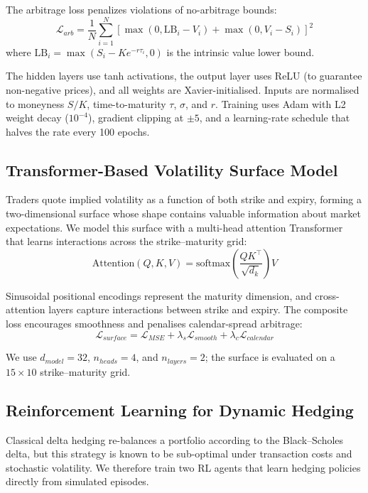 \documentclass[conference]{IEEEtran}
\begin{document}
The arbitrage loss penalizes violations of no-arbitrage bounds:
\begin{equation}
    \mathcal{L}_{arb} = \frac{1}{N} \sum_{i=1}^{N} \left[\max(0, \text{LB}_i - V_i) + \max(0, V_i - S_i)\right]^2
\end{equation}
where $\text{LB}_i = \max(S_i - Ke^{-r\tau_i}, 0)$ is the intrinsic value lower bound.

The hidden layers use tanh activations, the output layer uses ReLU (to guarantee non-negative prices), and all weights are Xavier-initialised. Inputs are normalised to moneyness $S/K$, time-to-maturity $\tau$, $\sigma$, and $r$. Training uses Adam with L2 weight decay ($10^{-4}$), gradient clipping at $\pm 5$, and a learning-rate schedule that halves the rate every 100 epochs.

\subsection{Transformer-Based Volatility Surface Model}

Traders quote implied volatility as a function of both strike and expiry, forming a two-dimensional surface whose shape contains valuable information about market expectations. We model this surface with a multi-head attention Transformer that learns interactions across the strike--maturity grid:
\begin{equation}
    \text{Attention}(Q, K, V) = \text{softmax}\left(\frac{QK^\top}{\sqrt{d_k}}\right)V
\end{equation}

Sinusoidal positional encodings represent the maturity dimension, and cross-attention layers capture interactions between strike and expiry. The composite loss encourages smoothness and penalises calendar-spread arbitrage:
\begin{equation}
    \mathcal{L}_{surface} = \mathcal{L}_{MSE} + \lambda_{s}\mathcal{L}_{smooth} + \lambda_{c}\mathcal{L}_{calendar}
\end{equation}

We use $d_{model}=32$, $n_{heads}=4$, and $n_{layers}=2$; the surface is evaluated on a $15 \times 10$ strike--maturity grid.

\subsection{Reinforcement Learning for Dynamic Hedging}

Classical delta hedging re-balances a portfolio according to the Black--Scholes delta, but this strategy is known to be sub-optimal under transaction costs and stochastic volatility. We therefore train two RL agents that learn hedging policies directly from simulated episodes.
\end{document}
